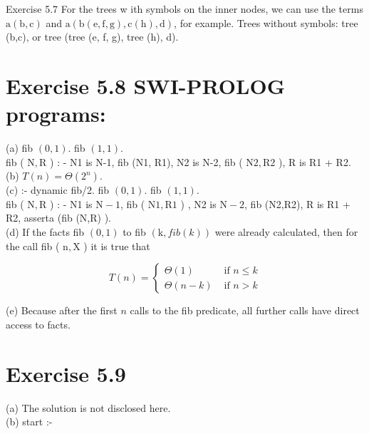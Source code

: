 \documentclass[10pt]{article}
\begin{document}
Exercise 5.7 For the trees w
ith symbols on the inner nodes, we can use the terms $\mathrm{a}(\mathrm{b}, \mathrm{c})$ and $\mathrm{a}(\mathrm{b}(\mathrm{e}, \mathrm{f}, \mathrm{g}), \mathrm{c}(\mathrm{h}), \mathrm{d})$, for example. Trees without symbols: tree (b,c), or tree (tree (e, f, g), tree (h), d).

\section*{Exercise 5.8 SWI-PROLOG programs:}
(a) fib $(0,1)$. fib $(1,1)$.\\
fib ( $\mathrm{N}, \mathrm{R}$ ) : - N1 is N-1, fib (N1, R1), N2 is N-2, fib ( $\mathrm{N} 2, \mathrm{R} 2$ ), R is R1 + R2.\\
(b) $T(n)=\Theta\left(2^{n}\right)$.\\
(c) :- dynamic fib/2. fib $(0,1)$. fib $(1,1)$.\\
fib ( $\mathrm{N}, \mathrm{R}$ ) : - N1 is $\mathrm{N}-1$, fib ( $\mathrm{N} 1, \mathrm{R} 1$ ) , N2 is $\mathrm{N}-2$, fib (N2,R2), R is R1 + R2, asserta (fib (N,R) ).\\
(d) If the facts fib $(0,1)$ to fib $(\mathrm{k}, f i b(k))$ were already calculated, then for the call fib ( $\mathrm{n}, \mathrm{X}$ ) it is true that

$$
T(n)= \begin{cases}\Theta(1) & \text { if } n \leq k \\ \Theta(n-k) & \text { if } n>k\end{cases}
$$

(e) Because after the first $n$ calls to the fib predicate, all further calls have direct access to facts.

\section*{Exercise 5.9}
(a) The solution is not disclosed here.\\
(b) start :-
\end{document}

